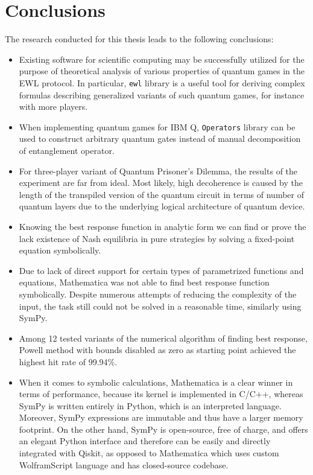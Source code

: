 \documentclass[../main.tex]{subfiles}
\begin{document}
\clearpage
\section{Conclusions}
\label{sec:9_conclusions}

The research conducted for this thesis leads to the following conclusions:

\begin{itemize}
    \item Existing software for scientific computing may be successfully utilized for the purpose of theoretical analysis of various properties of quantum games in the EWL protocol. In particular, \texttt{ewl} library is a useful tool for deriving complex formulas describing generalized variants of such quantum games, for instance with more players.

    \item When implementing quantum games for IBM Q, \texttt{Operators} library can be used to construct arbitrary quantum gates instead of manual decomposition of entanglement operator.
    
    \item For three-player variant of Quantum Prisoner's Dilemma, the results of the experiment are far from ideal. Most likely, high decoherence is caused by the length of the transpiled version of the quantum circuit in terms of number of quantum layers due to the underlying logical architecture of quantum device.
    
    \item Knowing the best response function in analytic form we can find or prove the lack existence of Nash equilibria in pure strategies by solving a fixed-point equation symbolically.
    
    \item Due to lack of direct support for certain types of parametrized functions and equations, Mathematica was not able to find best response function symbolically. Despite numerous attempts of reducing the complexity of the input, the task still could not be solved in a reasonable time, similarly using SymPy.
    
    \item Among 12 tested variants of the numerical algorithm of finding best response, Powell method with bounds disabled as zero as starting point achieved the highest hit rate of 99.94\%.
    
    \item When it comes to symbolic calculations, Mathematica is a clear winner in terms of performance, because its kernel is implemented in C/C++, whereas SymPy is written entirely in Python, which is an interpreted language. Moreover, SymPy expressions are immutable and thus have a larger memory footprint. On the other hand, SymPy is open-source, free of charge, and offers an elegant Python interface and therefore can be easily and directly integrated with Qiskit, as opposed to Mathematica which uses custom WolframScript language and has closed-source codebase.
    

\end{itemize}
\end{document}
